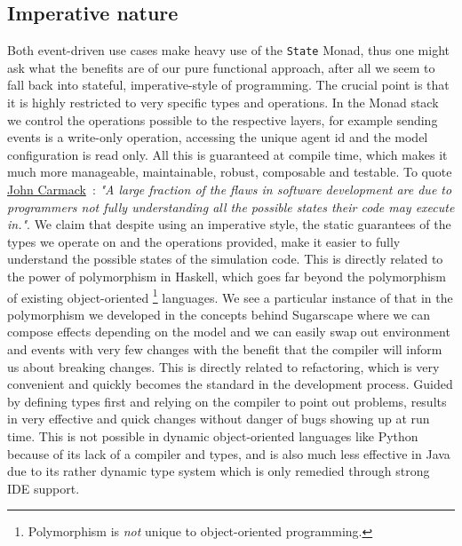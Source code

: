 \subsection{Imperative nature}
Both event-driven use cases make heavy use of the \texttt{State} Monad, thus one might ask what the benefits are of our pure functional approach, after all we seem to fall back into stateful, imperative-style of programming. %
The crucial point is that it is highly restricted to very specific types and operations. In the Monad stack we control the operations possible to the respective layers, for example sending events is a write-only operation, accessing the unique agent id and the model configuration is read only. All this is guaranteed at compile time, which makes it much more manageable, maintainable, robust, composable and testable.
To quote \href{https://www.gamasutra.com/view/news/169296/Indepth_Functional_programming_in_C.php}{John Carmack}~\cite{gamasutra_carmack_fp}: \emph{"A large fraction of the flaws in software development are due to programmers not fully understanding all the possible states their code may execute in."}. We claim that despite using an imperative style, the static guarantees of the types we operate on and the operations provided, make it easier to fully understand the possible states of the simulation code.
This is directly related to the power of polymorphism in Haskell, which goes far beyond the polymorphism of existing object-oriented \footnote{Polymorphism is \textit{not} unique to object-oriented programming.} languages.
We see a particular instance of that in the polymorphism we developed in the concepts behind Sugarscape where we can compose effects depending on the model and we can easily swap out environment and events with very few changes with the benefit that the compiler will inform us about breaking changes. This is directly related to refactoring, which is very convenient and quickly becomes the standard in the development process. Guided by defining types first and relying on the compiler to point out problems, results in very effective and quick changes without danger of bugs showing up at run time. This is not possible in dynamic object-oriented languages like Python because of its lack of a compiler and types, and is also much less effective in Java due to its rather dynamic type system which is only remedied through strong IDE support.

